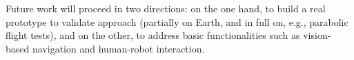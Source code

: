 \documentclass{article}
\begin{document}
Future work will proceed in two directions: on the one hand, to build
a real prototype to validate approach (partially on Earth, and in full
on, e.g., parabolic flight tests), and on the other, to address basic
functionalities such as vision-based navigation and human-robot
interaction.




\end{document}
